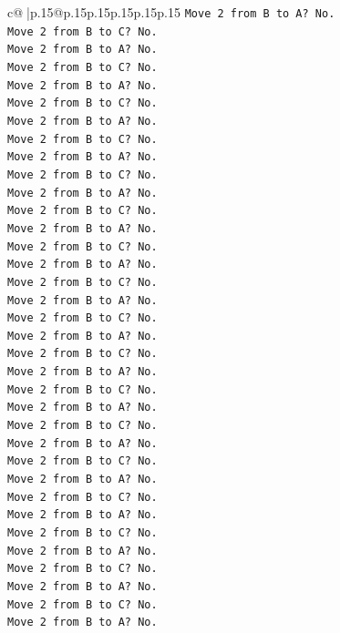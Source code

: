 \documentclass{article}
\begin{document}
{\begin{supertabular}{c@{$\;$}|p{.15\linewidth}@{}p{.15\linewidth}p{.15\linewidth}p{.15\linewidth}p{.15\linewidth}p{.15\linewidth}}
{{{\texttt{Move 2 from B to A? No.} \\
\texttt{Move 2 from B to C? No.} \\
\texttt{Move 2 from B to A? No.} \\
\texttt{Move 2 from B to C? No.} \\
\texttt{Move 2 from B to A? No.} \\
\texttt{Move 2 from B to C? No.} \\
\texttt{Move 2 from B to A? No.} \\
\texttt{Move 2 from B to C? No.} \\
\texttt{Move 2 from B to A? No.} \\
\texttt{Move 2 from B to C? No.} \\
\texttt{Move 2 from B to A? No.} \\
\texttt{Move 2 from B to C? No.} \\
\texttt{Move 2 from B to A? No.} \\
\texttt{Move 2 from B to C? No.} \\
\texttt{Move 2 from B to A? No.} \\
\texttt{Move 2 from B to C? No.} \\
\texttt{Move 2 from B to A? No.} \\
\texttt{Move 2 from B to C? No.} \\
\texttt{Move 2 from B to A? No.} \\
\texttt{Move 2 from B to C? No.} \\
\texttt{Move 2 from B to A? No.} \\
\texttt{Move 2 from B to C? No.} \\
\texttt{Move 2 from B to A? No.} \\
\texttt{Move 2 from B to C? No.} \\
\texttt{Move 2 from B to A? No.} \\
\texttt{Move 2 from B to C? No.} \\
\texttt{Move 2 from B to A? No.} \\
\texttt{Move 2 from B to C? No.} \\
\texttt{Move 2 from B to A? No.} \\
\texttt{Move 2 from B to C? No.} \\
\texttt{Move 2 from B to A? No.} \\
\texttt{Move 2 from B to C? No.} \\
\texttt{Move 2 from B to A? No.} \\
\texttt{Move 2 from B to C? No.} \\
\texttt{Move 2 from B to A? No.} \\
}}}
\end{supertabular}}
\end{document}
